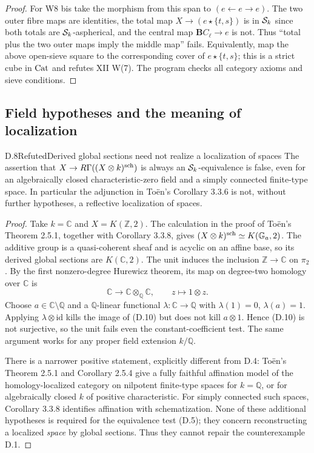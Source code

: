 \begin{proof}
For W8 bis take the morphism from this span to
$(e\leftarrow e\to e)$. The two outer fibre maps are identities,
the total map $X\to(e\star\{t,s\})$ is in $\mathcal S_k$ since both totals
are $\mathcal S_k$-aspherical, and the central map
$\mathbf B C_\ell\to e$ is not. Thus ``total plus the two outer
maps imply the middle map'' fails. Equivalently, map the above
open-sieve square to the corresponding cover of
$e\star\{t,s\}$; this is a strict cube in $\mathrm{Cat}$ and refutes XII
W(7). The program checks all category axioms and sieve conditions.
\end{proof}

\subsection{Field hypotheses and the meaning of localization}

\begin{claim}{D.8}{Refuted}{Derived global sections need not realize a localization of spaces}
\label{D8}
The assertion that $X\to R\Gamma((X\otimes k)^{\mathrm{sch}})$ is always
an $\mathcal S_k$-equivalence is false, even for an algebraically closed
characteristic-zero field and a simply connected finite-type space.
In particular the adjunction in To\"en's Corollary 3.3.6 is not,
without further hypotheses, a reflective localization of spaces.
\end{claim}
\begin{proof}
Take $k=\mathbb C$ and $X=K(\mathbb Z,2)$.
The calculation in the proof of To\"en's Theorem 2.5.1, together
with Corollary 3.3.8, gives
$(X\otimes k)^{\mathrm{sch}}\simeq K(\mathbb G_a,2)$.
The additive group is a quasi-coherent sheaf and is acyclic on an
affine base, so its derived global sections are $K(\mathbb C,2)$.
The unit induces the inclusion $\mathbb Z\to\mathbb C$ on $\pi_2$.
By the first nonzero-degree Hurewicz theorem, its map on degree-two
homology over $\mathbb C$ is
\[
 \mathbb C\longrightarrow\mathbb C\otimes_{\mathbb Q}\mathbb C,
 \qquad z\longmapsto1\otimes z.
 \tag{D.10}
\]
Choose $a\in\mathbb C\setminus\mathbb Q$ and a $\mathbb Q$-linear
functional $\lambda:\mathbb C\to\mathbb Q$ with
$\lambda(1)=0$, $\lambda(a)=1$. Applying
$\lambda\otimes\mathrm{id}$ kills the image of (D.10) but does not
kill $a\otimes1$. Hence (D.10) is not surjective, so the unit fails
even the constant-coefficient test. The same argument works for any
proper field extension $k/\mathbb Q$.

There is a narrower positive statement, explicitly different from
D.4: To\"en's Theorem 2.5.1 and Corollary 2.5.4 give a fully faithful
affination model of the homology-localized category on nilpotent
finite-type spaces for $k=\mathbb Q$, or for algebraically closed
$k$ of positive characteristic. For simply connected such spaces,
Corollary 3.3.8 identifies affination with schematization. None of
these additional hypotheses is required for the equivalence test
(D.5); they concern reconstructing a localized \emph{space} by
global sections. Thus they cannot repair the counterexample D.1.
\end{proof}

